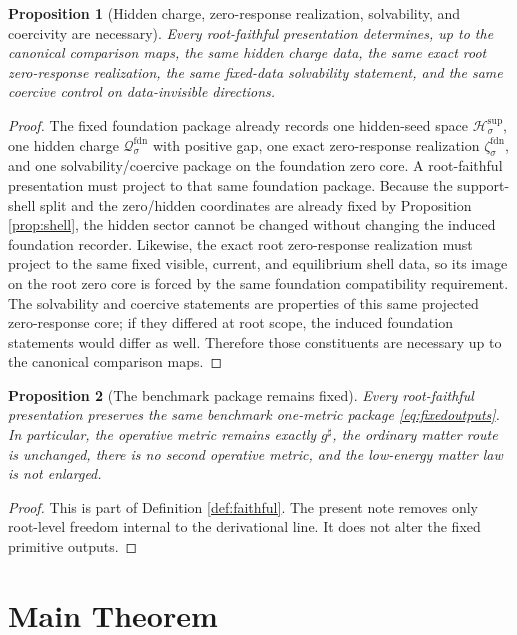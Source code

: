 \documentclass[11pt]{article}
\newcommand{\CompletedMetric}{g^{\sharp}}
\newcommand{\FoundCharge}[1]{\mathcal Q_{#1}^{\mathrm{fdn}}}
\newcommand{\FoundEmbed}[1]{\zeta_{#1}^{\mathrm{fdn}}}
\newcommand{\SeedHidden}[1]{\mathcal H_{#1}^{\mathrm{sup}}}
\newtheorem{proposition}{Proposition}
\begin{document}
\begin{proposition}[Hidden charge, zero-response realization, solvability, and coercivity are necessary]
\label{prop:hidden}
Every root-faithful presentation determines, up to the canonical comparison maps, the same hidden charge data, the same exact root zero-response realization, the same fixed-data solvability statement, and the same coercive control on data-invisible directions.
\end{proposition}

\begin{proof}
The fixed foundation package already records one hidden-seed space \(\SeedHidden{\sigma}\), one hidden charge \(\FoundCharge{\sigma}\) with positive gap, one exact zero-response realization \(\FoundEmbed{\sigma}\), and one solvability/coercive package on the foundation zero core. A root-faithful presentation must project to that same foundation package. Because the support-shell split and the zero/hidden coordinates are already fixed by Proposition \ref{prop:shell}, the hidden sector cannot be changed without changing the induced foundation recorder. Likewise, the exact root zero-response realization must project to the same fixed visible, current, and equilibrium shell data, so its image on the root zero core is forced by the same foundation compatibility requirement. The solvability and coercive statements are properties of this same projected zero-response core; if they differed at root scope, the induced foundation statements would differ as well. Therefore those constituents are necessary up to the canonical comparison maps.
\end{proof}

\begin{proposition}[The benchmark package remains fixed]
\label{prop:benchmark}
Every root-faithful presentation preserves the same benchmark one-metric package \eqref{eq:fixedoutputs}. In particular, the operative metric remains exactly \(\CompletedMetric\), the ordinary matter route is unchanged, there is no second operative metric, and the low-energy matter law is not enlarged.
\end{proposition}

\begin{proof}
This is part of Definition \ref{def:faithful}. The present note removes only root-level freedom internal to the derivational line. It does not alter the fixed primitive outputs.
\end{proof}

\section{Main Theorem}
\end{document}
